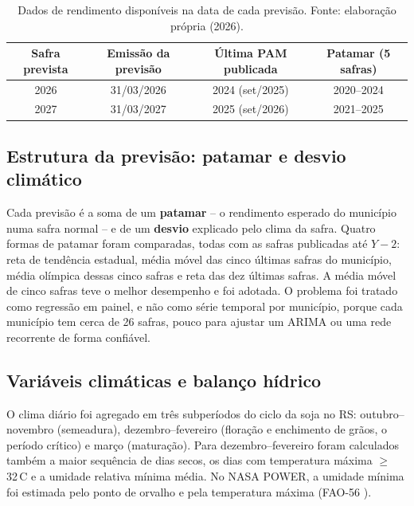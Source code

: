 \documentclass[12pt]{article}
\begin{document}
\begin{table}[ht]
\centering
\caption{Dados de rendimento disponíveis na data de cada previsão. Fonte:
  elaboração própria (2026).}
\label{tab:disponiveis}
\begin{tabular}{|c|c|c|c|}
\hline
\textbf{Safra prevista} & \textbf{Emissão da previsão} &
  \textbf{Última PAM publicada} & \textbf{Patamar (5 safras)} \\ \hline
2026 & 31/03/2026 & 2024 (set/2025) & 2020--2024 \\ \hline
2027 & 31/03/2027 & 2025 (set/2026) & 2021--2025 \\ \hline
\end{tabular}
\end{table}

\subsection{Estrutura da previsão: patamar e desvio climático}

Cada previsão é a soma de um \textbf{patamar} -- o rendimento esperado do
município numa safra normal -- e de um \textbf{desvio} explicado pelo
clima da safra. Quatro formas de patamar foram comparadas, todas com as
safras publicadas até $Y-2$: reta de tendência estadual, média móvel das
cinco últimas safras do município, média olímpica dessas cinco safras e
reta das dez últimas safras. A média móvel de cinco safras teve o melhor
desempenho e foi adotada. O problema foi tratado como regressão em
painel, e não como série temporal por município, porque cada município
tem cerca de 26 safras, pouco para ajustar um ARIMA ou uma rede recorrente
de forma confiável.

\subsection{Variáveis climáticas e balanço hídrico}

O clima diário foi agregado em três subperíodos do ciclo da soja no RS:
outubro--novembro (semeadura), dezembro--fevereiro (floração e enchimento
de grãos, o período crítico) e março (maturação). Para
dezembro--fevereiro foram calculados também a maior sequência de dias
secos, os dias com temperatura máxima $\geq$ 32\,\textdegree C e a
umidade relativa mínima média. No NASA POWER, a umidade mínima foi
estimada pelo ponto de orvalho e pela temperatura máxima (FAO-56
\cite{allen1998}).
\end{document}
